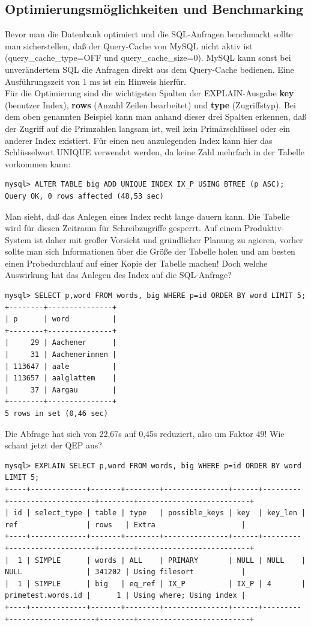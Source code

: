 \subsection{Optimierungsmöglichkeiten und Benchmarking}
Bevor man die Datenbank optimiert und die SQL-Anfragen benchmarkt sollte man sicherstellen,
daß der Query-Cache von MySQL nicht aktiv ist (query\_cache\_type=OFF und query\_cache\_size=0). MySQL kann sonst bei unverändertem SQL die Anfragen direkt aus dem Query-Cache bedienen. Eine Ausführungszeit von 1 ms ist ein Hinweis hierfür.\\
Für die Optimierung sind die wichtigsten Spalten der EXPLAIN-Ausgabe \textbf{key} (benutzer Index), \textbf{rows} (Anzahl Zeilen bearbeitet) und \textbf{type} (Zugriffstyp).
Bei dem oben genannten Beispiel kann man anhand dieser drei Spalten erkennen, daß der Zugriff auf die Primzahlen langsam ist, weil kein Primärschlüssel oder ein anderer Index existiert.
Für einen neu anzulegenden Index kann hier das Schlüsselwort UNIQUE verwendet werden, da keine Zahl mehrfach in der Tabelle vorkommen kann:
\begin{lstlisting}
mysql> ALTER TABLE big ADD UNIQUE INDEX IX_P USING BTREE (p ASC);
Query OK, 0 rows affected (48,53 sec)
\end{lstlisting}
Man sieht, daß das Anlegen eines Index recht lange dauern kann. Die Tabelle wird für diesen Zeitraum für Schreibzugriffe gesperrt. Auf einem Produktiv-System ist daher mit großer Vorsicht und gründlicher Planung zu agieren, vorher sollte man sich Informationen über die Größe der Tabelle holen und am besten einen Probedurchlauf auf einer Kopie der Tabelle machen!
Doch welche Auswirkung hat das Anlegen des Index auf die SQL-Anfrage?
\begin{lstlisting}
mysql> SELECT p,word FROM words, big WHERE p=id ORDER BY word LIMIT 5;
+--------+---------------+
| p      | word          |
+--------+---------------+
|     29 | Aachener      |
|     31 | Aachenerinnen |
| 113647 | aale          |
| 113657 | aalglattem    |
|     37 | Aargau        |
+--------+---------------+
5 rows in set (0,46 sec)
\end{lstlisting}
Die Abfrage hat sich von 22,67s auf 0,45s reduziert, also um Faktor 49!
Wie schaut jetzt der QEP aus?
\begin{lstlisting}[basicstyle=\ttfamily\tiny]
mysql> EXPLAIN SELECT p,word FROM words, big WHERE p=id ORDER BY word LIMIT 5;
+----+-------------+-------+--------+---------------+------+---------+--------------------+--------+--------------------------+
| id | select_type | table | type   | possible_keys | key  | key_len | ref                | rows   | Extra                    |
+----+-------------+-------+--------+---------------+------+---------+--------------------+--------+--------------------------+
|  1 | SIMPLE      | words | ALL    | PRIMARY       | NULL | NULL    | NULL               | 341202 | Using filesort           |
|  1 | SIMPLE      | big   | eq_ref | IX_P          | IX_P | 4       | primetest.words.id |      1 | Using where; Using index |
+----+-------------+-------+--------+---------------+------+---------+--------------------+--------+--------------------------+
\end{lstlisting}

